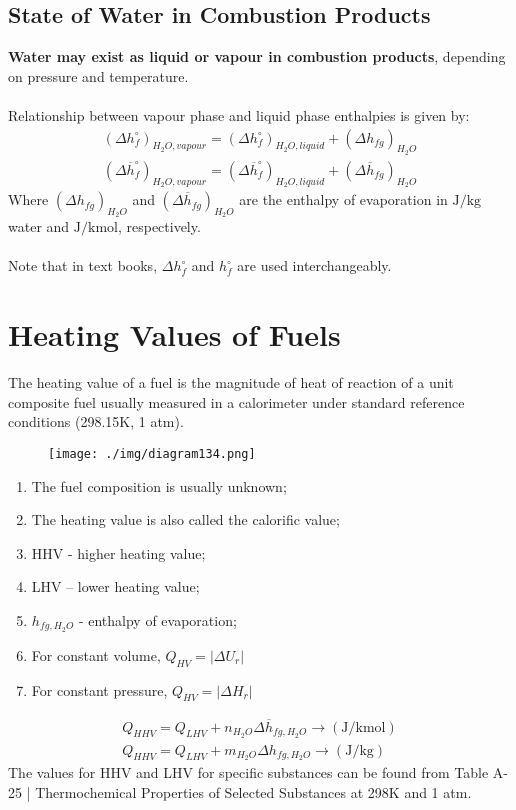 \subsection{State of Water in Combustion Products}
\textbf{Water may exist as liquid or vapour in combustion products}, depending on pressure and temperature. \\\\
Relationship between vapour phase and liquid phase enthalpies is given by:
\begin{gather}
  \left(\Delta h_f^\circ\right)_{H_2O,vapour} = \left(\Delta h_f^\circ\right)_{H_2O,liquid} + \left(\Delta h_{fg}\right)_{H_2O} \\[5pt]
  \left(\Delta\overline{h}_f^\circ\right)_{H_2O,vapour} = \left(\Delta\overline{h}_f^\circ\right)_{H_2O,liquid} + \left(\Delta \overline{h}_{fg}\right)_{H_2O}
\end{gather}
Where $\left(\Delta h_{fg}\right)_{H_2O}$ and $\left(\Delta \overline{h}_{fg}\right)_{H_2O}$ are the enthalpy of evaporation in $\si{\joule\per\kilogram}$water and $\si{\joule\per\kilo\mole}$, respectively. \\\\
Note that in text books, $\Delta h_f^\circ$ and $h_f^\circ$ are used interchangeably.
\section{Heating Values of Fuels}
The heating value of a fuel is the magnitude of heat of reaction of a unit composite fuel usually measured in a calorimeter under standard reference conditions (298.15K, 1 atm).
\begin{figure}[H]
  \centering
  \texttt{[image: ./img/diagram134.png]}
  \caption{}
\end{figure}
\begin{enumerate}[noitemsep]
  \item The fuel composition is usually unknown;
  \item The heating value is also called the calorific value;
  \item HHV - higher heating value;
  \item LHV – lower heating value;
  \item $h_{fg,H_2O}$ - enthalpy of evaporation;
  \item For constant volume, $Q_{HV} = |\Delta U_r|$
  \item For constant pressure, $Q_{HV} = |\Delta H_r|$
\end{enumerate}
\begin{gather}
  Q_{HHV} = Q_{LHV} + n_{H_2O}\Delta\overline{h}_{fg,H_2O} \longrightarrow (\si{\joule\per\kilo\mole})\\[5pt]
  Q_{HHV} = Q_{LHV} + m_{H_2O}\Delta h_{fg,H_2O} \longrightarrow (\si{\joule\per\kilogram})
\end{gather}
The values for HHV and LHV for specific substances can be found from Table A-25 | Thermochemical Properties of Selected Substances at 298K and 1 atm.
